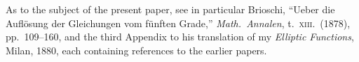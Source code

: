 \documentclass[11pt]{article}
\begin{document}
\medskip
As to the subject of the present paper, see in particular Brioschi,
``Ueber die Aufl\"osung der Gleichungen vom f\"unften Grade,''
\textit{Math.\ Annalen}, t.~\textsc{xiii}.\ (1878), pp.\ 109--160,
and the third Appendix to his translation of my \textit{Elliptic
Functions}, Milan, 1880, each containing references to the earlier
papers.
\end{document}

